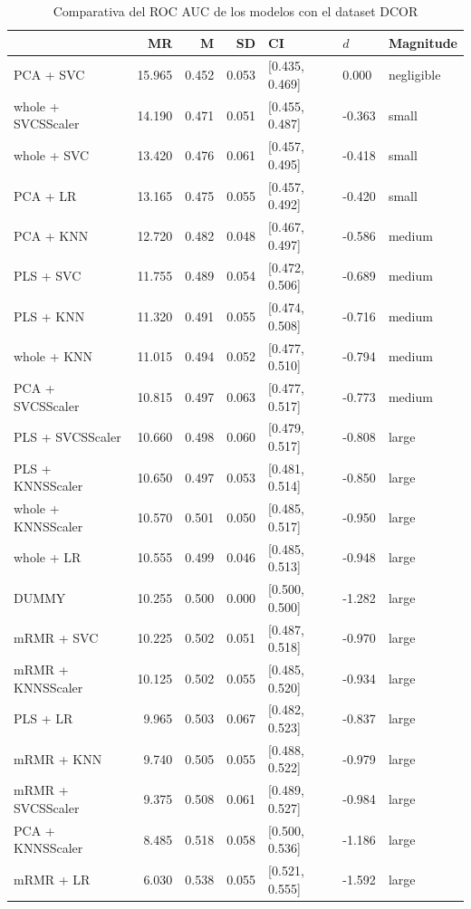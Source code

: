\documentclass[a4paper,oneside,11pt,leqno]{article}
\begin{document}
	\begin{table}[h]
		\centering
		\begin{tabular}{lrrrlll}
			\toprule
			{} &     MR &     M &    SD &              CI &    $d$ &   Magnitude \\
			\midrule
			PCA + SVC          & 15.965 & 0.452 & 0.053 &  [0.435, 0.469] &  0.000 &  negligible \\
			whole + SVCSScaler & 14.190 & 0.471 & 0.051 &  [0.455, 0.487] & -0.363 &       small \\
			whole + SVC        & 13.420 & 0.476 & 0.061 &  [0.457, 0.495] & -0.418 &       small \\
			PCA + LR           & 13.165 & 0.475 & 0.055 &  [0.457, 0.492] & -0.420 &       small \\
			PCA + KNN          & 12.720 & 0.482 & 0.048 &  [0.467, 0.497] & -0.586 &      medium \\
			PLS + SVC          & 11.755 & 0.489 & 0.054 &  [0.472, 0.506] & -0.689 &      medium \\
			PLS + KNN          & 11.320 & 0.491 & 0.055 &  [0.474, 0.508] & -0.716 &      medium \\
			whole + KNN        & 11.015 & 0.494 & 0.052 &  [0.477, 0.510] & -0.794 &      medium \\
			PCA + SVCSScaler   & 10.815 & 0.497 & 0.063 &  [0.477, 0.517] & -0.773 &      medium \\
			PLS + SVCSScaler   & 10.660 & 0.498 & 0.060 &  [0.479, 0.517] & -0.808 &       large \\
			PLS + KNNSScaler   & 10.650 & 0.497 & 0.053 &  [0.481, 0.514] & -0.850 &       large \\
			whole + KNNSScaler & 10.570 & 0.501 & 0.050 &  [0.485, 0.517] & -0.950 &       large \\
			whole + LR         & 10.555 & 0.499 & 0.046 &  [0.485, 0.513] & -0.948 &       large \\
			DUMMY              & 10.255 & 0.500 & 0.000 &  [0.500, 0.500] & -1.282 &       large \\
			mRMR + SVC         & 10.225 & 0.502 & 0.051 &  [0.487, 0.518] & -0.970 &       large \\
			mRMR + KNNSScaler  & 10.125 & 0.502 & 0.055 &  [0.485, 0.520] & -0.934 &       large \\
			PLS + LR           &  9.965 & 0.503 & 0.067 &  [0.482, 0.523] & -0.837 &       large \\
			mRMR + KNN         &  9.740 & 0.505 & 0.055 &  [0.488, 0.522] & -0.979 &       large \\
			mRMR + SVCSScaler  &  9.375 & 0.508 & 0.061 &  [0.489, 0.527] & -0.984 &       large \\
			PCA + KNNSScaler   &  8.485 & 0.518 & 0.058 &  [0.500, 0.536] & -1.186 &       large \\
			mRMR + LR          &  6.030 & 0.538 & 0.055 &  [0.521, 0.555] & -1.592 &       large \\
			\bottomrule
		\end{tabular}
		\caption{Comparativa del ROC AUC de los modelos con el dataset DCOR}
		\label{tab:stat_results_dcor}
	\end{table}
	
\end{document}

